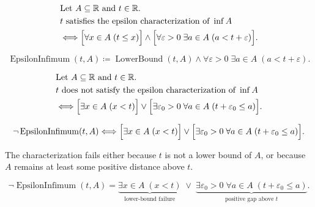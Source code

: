 \begin{remark*}
\[
\begin{aligned}
&\text{Let } A\subseteq\mathbb{R} \text{ and } t\in\mathbb{R}.\\
&t \text{ satisfies the epsilon characterization of } \inf A\\
&\Longleftrightarrow
\Bigl[\forall x\in A\;(t\le x)\Bigr]
\land
\Bigl[\forall \varepsilon>0\;\exists a\in A\;(a<t+\varepsilon)\Bigr].
\end{aligned}
\]
\end{remark*}

\begin{remark*}
\[
\operatorname{EpsilonInfimum}(t,A)\coloneqq
\operatorname{LowerBound}(t,A)
\land
\forall \varepsilon>0\;\exists a\in A\;(a<t+\varepsilon).
\]
\end{remark*}

\begin{remark*}
\[
\begin{aligned}
&\text{Let } A\subseteq\mathbb{R} \text{ and } t\in\mathbb{R}.\\
&t \text{ does not satisfy the epsilon characterization of } \inf A\\
&\Longleftrightarrow
\Bigl[\exists x\in A\;(x<t)\Bigr]
\lor
\Bigl[\exists \varepsilon_0>0\;\forall a\in A\;(t+\varepsilon_0\le a)\Bigr].
\end{aligned}
\]
\end{remark*}

\begin{remark*}
\[
\neg\operatorname{EpsilonInfimum}(t,A)\Longleftrightarrow
\Bigl[\exists x\in A\;(x<t)\Bigr]
\lor
\Bigl[\exists \varepsilon_0>0\;\forall a\in A\;(t+\varepsilon_0\le a)\Bigr].
\]
\end{remark*}

\begin{remark*}
The characterization fails either because $t$ is not a lower bound of $A$, or because $A$ remains at least some positive distance above $t$.
\end{remark*}

\begin{remark*}
\[
\neg\operatorname{EpsilonInfimum}(t,A)
=
\underbrace{\exists x\in A\;(x<t)}_{\text{lower-bound failure}}
\;\lor\;
\underbrace{\exists \varepsilon_0>0\;\forall a\in A\;(t+\varepsilon_0\le a)}_{\text{positive gap above }t}.
\]
\end{remark*}

